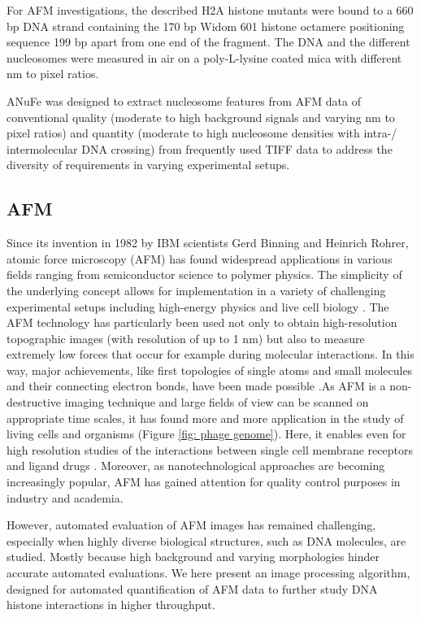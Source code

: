 \documentclass{article}
\begin{document}
For AFM investigations, the described H2A histone mutants were bound to a 660 bp DNA strand containing the 170 bp Widom 601 histone octamere positioning sequence \cite{lowary1998new} 199 bp apart from one end of the fragment. The DNA and the different nucleosomes were measured in air on a poly-L-lysine coated mica with different nm to pixel ratios. 


ANuFe was designed to extract nucleosome features from AFM data of conventional quality (moderate to high background signals and varying nm to pixel ratios) and quantity (moderate to high nucleosome densities with intra-/ intermolecular DNA crossing) from frequently used TIFF data to address the diversity of requirements in varying experimental setups.


\subsection{AFM}\label{sec: AFM}
Since its invention in 1982 by IBM scientists Gerd Binning and Heinrich Rohrer, atomic force microscopy (AFM) has found widespread applications in various fields ranging from semiconductor science to polymer physics. The simplicity of the underlying concept allows for implementation in a variety of challenging experimental setups including high-energy physics  \cite{fischbach2001new} and live cell biology  \cite{evans2007forces}. The AFM technology has particularly been used not only to obtain high-resolution topographic images (with resolution of up to 1 nm) but also to measure extremely low forces that occur for example during molecular interactions. In this way, major achievements, like first topologies of single atoms and small molecules and their connecting electron bonds, have been made possible  \cite{hoffmann2001direct}.As AFM is a non- destructive imaging technique and large fields of view can be scanned on appropriate time scales, it has found more and more application in the study of living cells and organisms (Figure \ref{fig: phage genome}). Here, it enables even for high resolution studies of the interactions between single cell membrane receptors and ligand drugs \cite{willemsen2000biomolecular}. Moreover, as nanotechnological approaches are becoming increasingly popular, AFM has gained attention for quality control purposes in industry and academia. 

However, automated evaluation of AFM images has remained challenging, especially when highly diverse biological structures, such as DNA molecules, are studied. Mostly because high background and varying morphologies hinder accurate automated evaluations. We here present an image processing algorithm, designed for automated quantification of AFM data to further study DNA histone interactions in higher throughput. 
\end{document}

